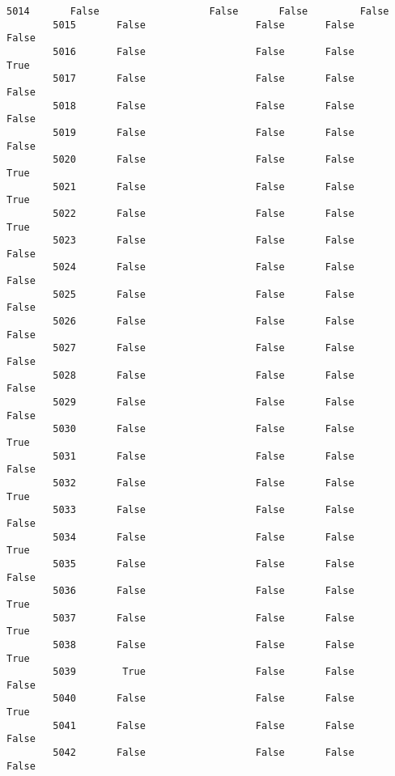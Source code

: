 \documentclass[11pt]{article}
\begin{document}
\begin{Verbatim}[commandchars=\\\{\}]
        5014       False                   False       False         False   
        5015       False                   False       False         False   
        5016       False                   False       False          True   
        5017       False                   False       False         False   
        5018       False                   False       False         False   
        5019       False                   False       False         False   
        5020       False                   False       False          True   
        5021       False                   False       False          True   
        5022       False                   False       False          True   
        5023       False                   False       False         False   
        5024       False                   False       False         False   
        5025       False                   False       False         False   
        5026       False                   False       False         False   
        5027       False                   False       False         False   
        5028       False                   False       False         False   
        5029       False                   False       False         False   
        5030       False                   False       False          True   
        5031       False                   False       False         False   
        5032       False                   False       False          True   
        5033       False                   False       False         False   
        5034       False                   False       False          True   
        5035       False                   False       False         False   
        5036       False                   False       False          True   
        5037       False                   False       False          True   
        5038       False                   False       False          True   
        5039        True                   False       False         False   
        5040       False                   False       False          True   
        5041       False                   False       False         False   
        5042       False                   False       False         False   
        

\end{Verbatim}
\end{document}
